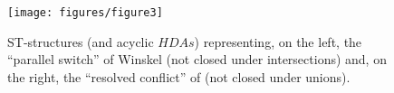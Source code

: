 \documentclass[submission,copyright,creativecommons]{eptcs}
\newcommand\HDAs{\ensuremath{\mathit{HDAs}}}
\begin{document}
\begin{figure}[tp]
\begin{center}
    \texttt{[image: figures/figure3]}
  \end{center}
\caption{ST-structures (and acyclic \HDAs) representing, on the left, the ``parallel switch'' of Winskel \cite[Ex.1.1.7]{Winskel86} (not closed under intersections) and, on the right, the ``resolved conflict'' of \cite[Ex.2]{GlabbeekP09configStruct} (not closed under unions).}
\label{fig_ex_winskel}
\end{figure}
\end{document}
